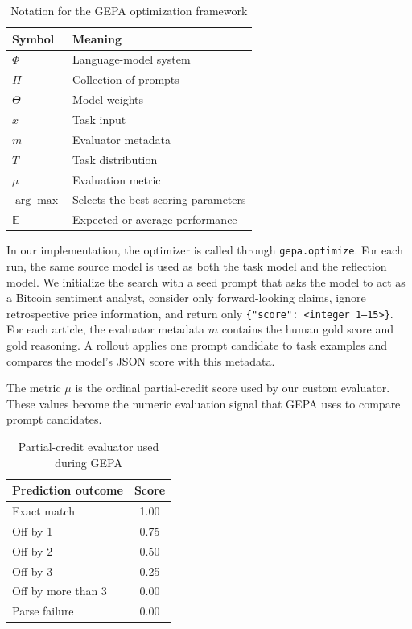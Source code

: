 \documentclass[sigconf,screen]{acmart}
\begin{document}
\begin{table}[t]
  \caption{Notation for the GEPA optimization framework}
  \label{tab:gepa-notation}
  \centering
  \small
  \setlength{\tabcolsep}{5pt}
  \begin{tabular}{@{}ll@{}}
    \toprule
    \textbf{Symbol} & \textbf{Meaning} \\
    \midrule
    $\Phi$ & Language-model system \\
    $\Pi$ & Collection of prompts \\
    $\Theta$ & Model weights \\
    $x$ & Task input \\
    $m$ & Evaluator metadata \\
    $T$ & Task distribution \\
    $\mu$ & Evaluation metric \\
    $\arg\max$ & Selects the best-scoring parameters \\
    $\mathbb{E}$ & Expected or average performance \\
    \bottomrule
  \end{tabular}
\end{table}

In our implementation, the optimizer is called through
\texttt{gepa.optimize}. For each run, the same source model is used as both
the task model and the reflection model. We initialize the search with a seed
prompt that asks the model to act as a Bitcoin sentiment analyst, consider
only forward-looking claims, ignore retrospective price information, and
return only \texttt{\{"score": <integer 1--15>\}}. For each article, the
evaluator metadata $m$ contains the human gold score and gold reasoning. A
rollout applies one prompt candidate to task examples and compares the model's
JSON score with this metadata.

The metric $\mu$ is the ordinal partial-credit score used by our custom
evaluator. These values become the numeric evaluation signal that GEPA uses to
compare prompt candidates.

\begin{table}[t]
  \caption{Partial-credit evaluator used during GEPA}
  \label{tab:gepa-evaluator}
  \centering
  \small
  \setlength{\tabcolsep}{6pt}
  \begin{tabular}{@{}lc@{}}
    \toprule
    \textbf{Prediction outcome} & \textbf{Score} \\
    \midrule
    Exact match & 1.00 \\
    Off by 1 & 0.75 \\
    Off by 2 & 0.50 \\
    Off by 3 & 0.25 \\
    Off by more than 3 & 0.00 \\
    Parse failure & 0.00 \\
    \bottomrule
  \end{tabular}
\end{table}
\end{document}
